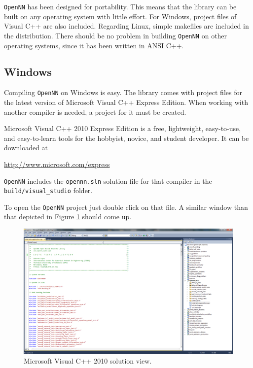 \texttt{OpenNN} has been designed for portability. This means that the library can be built on any operating system with little effort. 
For Windows, project files of Visual C++ are also included.
Regarding Linux, simple makefiles are included in the distribution. 
There should be no problem in building \texttt{OpenNN} on other operating systems, 
since it has been written in ANSI C++.

\subsection*{Windows}

Compiling \texttt{OpenNN} on Windows is easy. 
The library comes with project files for the latest version of Microsoft Visual C++ Express Edition.
When working with another compiler is needed, a project for it must be created.

Microsoft Visual C++ 2010 Express Edition is a free, lightweight,
easy-to-use, and easy-to-learn tools for the hobbyist, novice, and
student developer. It can be downloaded at

\begin{flushleft}
\href{http://www.microsoft.com/express}{http://www.microsoft.com/express}
\end{flushleft}

\texttt{OpenNN} includes the \lstinline"opennn.sln" solution file for that
compiler in the \lstinline"build/visual_studio" folder.

To open the \texttt{OpenNN} project just double click on that file. A
similar window than that depicted in Figure
\ref{VisualStudioSolution} should come up.

\begin{figure}[h!]
\begin{center}
\includegraphics[width=1.0\textwidth]{preliminaries/visual_studio}
\caption{Microsoft Visual C++ 2010 solution view.}\label{VisualStudioSolution}
\end{center}
\end{figure}

